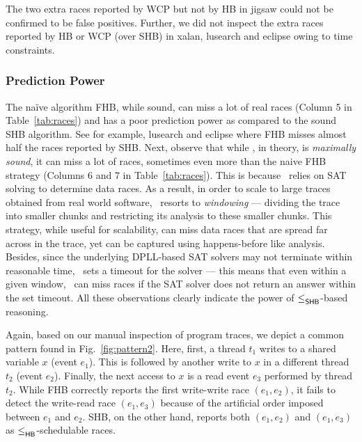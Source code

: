 The two extra races reported by WCP but not by HB in \textsf{jigsaw}
could not be confirmed to be false positives.
Further, we did not inspect the extra races reported by HB or WCP (over SHB) 
in \textsf{xalan}, \textsf{lusearch}
and \textsf{eclipse} owing to time constraints.




\subsubsection{Prediction Power}
The na\"{i}ve algorithm FHB, while sound, can miss a lot of real races
(Column 5 in Table~\ref{tab:races}) and has a poor prediction power as
compared to the sound SHB algorithm.  See for
example, \textsf{lusearch} and \textsf{eclipse} where FHB misses
almost half the races reported by SHB.  Next, observe that
while \rvpredict, in theory, is \emph{maximally sound}, it can miss a
lot of races, sometimes even more than the naive FHB strategy (Columns
6 and 7 in Table~\ref{tab:races}).  This is because \rvpredict~relies
on SAT solving to determine data races.  As a result, in order to
scale to large traces obtained from real world software,
\rvpredict~resorts to \emph{windowing} --- dividing the trace into
smaller chunks and restricting its analysis to these smaller chunks.
This strategy, while useful for scalability, can miss data races that
are spread far across in the trace, yet can be captured using
happens-before like analysis.  Besides, since the underlying
DPLL-based SAT solvers may not terminate within reasonable
time, \rvpredict~sets a timeout for the solver --- this means that
even within a given window, \rvpredict~can miss races if the SAT
solver does not return an answer within the set timeout.  All these
observations clearly indicate the power of $\leq^{}_{\mathsf{SHB}}$-based reasoning.

Again, based on our manual inspection of program traces, we depict a common
pattern found in Fig.~\ref{fig:pattern2}.
Here, first, a thread $t_1$ writes to a shared variable $x$ (event $e_1$).
This is followed by another write to $x$ in a different thread $t_2$
(event $e_2$). Finally, the next access to $x$ is a read event $e_3$
performed by thread $t_2$.
While FHB correctly reports the first write-write race $(e_1, e_2)$,
it fails to detect the write-read race $(e_1, e_3)$ because of the
artificial order imposed between $e_1$ and $e_2$.
SHB, on the other hand, reports both $(e_1, e_2)$
and $(e_1, e_3)$ as $\leq^{}_{\mathsf{HB}}$-schedulable races.

